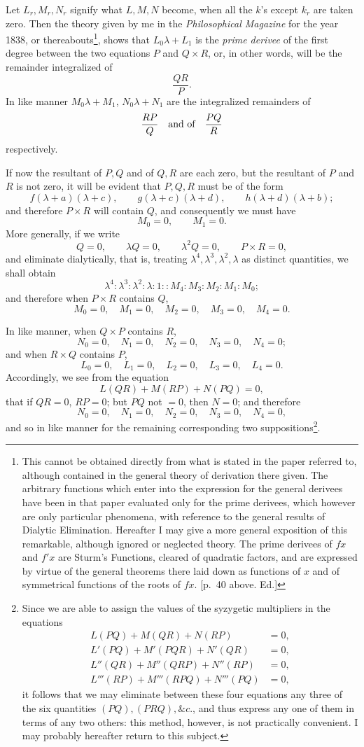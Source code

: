 \documentclass[11pt]{article}
\newcommand{\sourcepage}[1]{\marginpar{\scriptsize p.~#1}}
\begin{document}
{{Let $L_r,M_r,N_r$ signify what $L,M,N$ become, when all the $k$'s except $k_r$ are taken zero. Then the theory given by me in the \emph{Philosophical Magazine} for the year 1838, or thereabouts\footnote{This cannot be obtained directly from what is stated in the paper referred to, although contained in the general theory of derivation there given. The arbitrary functions which enter into the expression for the general derivees have been in that paper evaluated only for the prime derivees, which however are only particular phenomena, with reference to the general results of Dialytic Elimination. Hereafter I may give a more general exposition of this remarkable, although ignored or neglected theory. The prime derivees of $fx$ and $f'x$ are Sturm's Functions, cleared of quadratic factors, and are expressed by virtue of the general theorems there laid down as functions of $x$ and of symmetrical functions of the roots of $fx$. [p.~40 above. Ed.]}, shows that $L_0\lambda+L_1$ is the \emph{prime derivee} of the first degree between the two equations $P$ and $Q\times R$, or, in other words, will be the remainder integralized of
\[
\frac{QR}{P}.
\]
In like manner $M_0\lambda+M_1$, $N_0\lambda+N_1$ are the integralized remainders of
\[
\frac{RP}{Q}\quad\hbox{and of}\quad \frac{PQ}{R}
\]
respectively.

If now the resultant of $P,Q$ and of $Q,R$ are each zero, but the resultant of $P$ and $R$ is not zero, it will be evident that $P,Q,R$ must be of the form
\[
f(\lambda+a)(\lambda+c),\qquad
g(\lambda+c)(\lambda+d),\qquad
h(\lambda+d)(\lambda+b);
\]
and therefore $P\times R$ will contain $Q$, and consequently we must have
\[
M_0=0,\qquad M_1=0.
\]
More generally, if we write
\[
Q=0,\qquad
\lambda Q=0,\qquad
\lambda^2 Q=0,\qquad
P\times R=0,
\]
and eliminate dialytically, that is, treating $\lambda^4,\lambda^3,\lambda^2,\lambda$ as distinct quantities, we shall obtain
\[
\lambda^4:\lambda^3:\lambda^2:\lambda:1::M_4:M_3:M_2:M_1:M_0;
\]
and therefore when $P\times R$ contains $Q$,
\[
M_0=0,\quad M_1=0,\quad M_2=0,\quad M_3=0,\quad M_4=0.
\]

\sourcepage{134}
In like manner, when $Q\times P$ contains $R$,
\[
N_0=0,\quad N_1=0,\quad N_2=0,\quad N_3=0,\quad N_4=0;
\]
and when $R\times Q$ contains $P$,
\[
L_0=0,\quad L_1=0,\quad L_2=0,\quad L_3=0,\quad L_4=0.
\]
Accordingly, we see from the equation
\[
L(QR)+M(RP)+N(PQ)=0,
\]
that if $QR=0$, $RP=0$; but $PQ$ not $=0$, then $N=0$; and therefore
\[
N_0=0,\quad N_1=0,\quad N_2=0,\quad N_3=0,\quad N_4=0,
\]
and so in like manner for the remaining corresponding two suppositions\footnote{Since we are able to assign the values of the syzygetic multipliers in the equations
\[
\begin{aligned}
L(PQ)+M(QR)+N(RP)&=0,\\
L'(PQ)+M'(PQR)+N'(QR)&=0,\\
L''(QR)+M''(QRP)+N''(RP)&=0,\\
L'''(RP)+M'''(RPQ)+N'''(PQ)&=0,
\end{aligned}
\]
it follows that we may eliminate between these four equations any three of the six quantities $(PQ),(PRQ),\&c.$, and thus express any one of them in terms of any two others: this method, however, is not practically convenient. I may probably hereafter return to this subject.}.

}}
\end{document}
